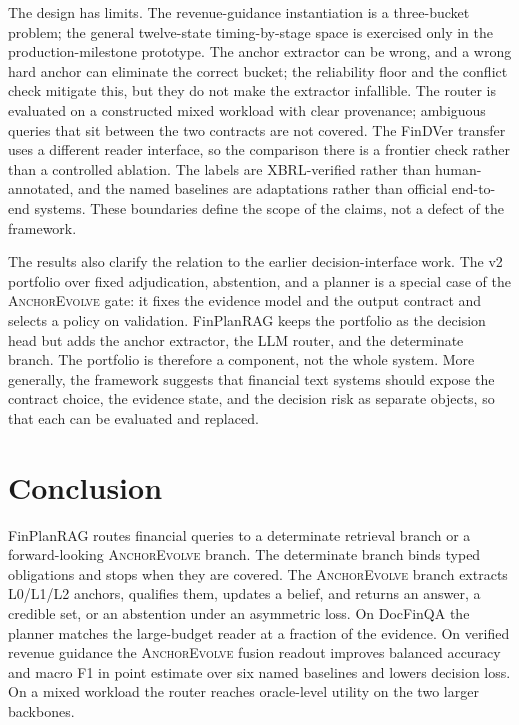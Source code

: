 \documentclass[11pt]{article}
\newcommand{\method}{FinPlanRAG}
\newcommand{\anchor}{\textsc{AnchorEvolve}}
\begin{document}
The design has limits. The revenue-guidance instantiation is a three-bucket problem; the general twelve-state timing-by-stage space is exercised only in the production-milestone prototype. The anchor extractor can be wrong, and a wrong hard anchor can eliminate the correct bucket; the reliability floor and the conflict check mitigate this, but they do not make the extractor infallible. The router is evaluated on a constructed mixed workload with clear provenance; ambiguous queries that sit between the two contracts are not covered. The FinDVer transfer uses a different reader interface, so the comparison there is a frontier check rather than a controlled ablation. The labels are XBRL-verified rather than human-annotated, and the named baselines are adaptations rather than official end-to-end systems. These boundaries define the scope of the claims, not a defect of the framework.

The results also clarify the relation to the earlier decision-interface work. The v2 portfolio over fixed adjudication, abstention, and a planner is a special case of the \anchor{} gate: it fixes the evidence model and the output contract and selects a policy on validation. \method{} keeps the portfolio as the decision head but adds the anchor extractor, the LLM router, and the determinate branch. The portfolio is therefore a component, not the whole system. More generally, the framework suggests that financial text systems should expose the contract choice, the evidence state, and the decision risk as separate objects, so that each can be evaluated and replaced.

\section{Conclusion}

\method{} routes financial queries to a determinate retrieval branch or a forward-looking \anchor{} branch. The determinate branch binds typed obligations and stops when they are covered. The \anchor{} branch extracts L0/L1/L2 anchors, qualifies them, updates a belief, and returns an answer, a credible set, or an abstention under an asymmetric loss. On DocFinQA the planner matches the large-budget reader at a fraction of the evidence. On verified revenue guidance the \anchor{} fusion readout improves balanced accuracy and macro F1 in point estimate over six named baselines and lowers decision loss. On a mixed workload the router reaches oracle-level utility on the two larger backbones.
\end{document}
